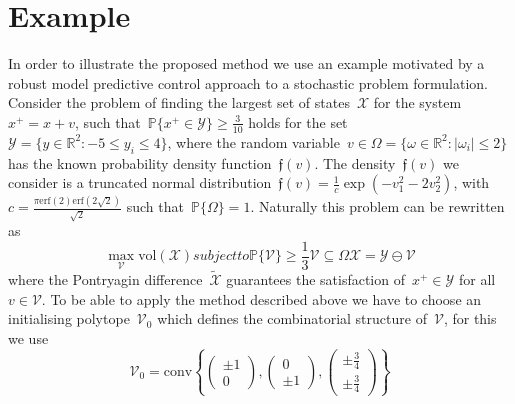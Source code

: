\documentclass[letterpaper, 10pt, conference]{ieeeconf} %
\providecommand{\abs}[1]{\left\lvert#1\right\rvert}
\providecommand{\conv}{\text{conv}}
\begin{document}
\section{Example}\label{sec:example}
%
%
\noindent In order to illustrate the proposed method we use an example motivated by a robust model predictive control approach to a stochastic problem formulation.
%
Consider the problem of finding the largest set of states~$\mathcal X$ for the system~$x^+=x+v$, such that~$\mathbb P\{x^+\in\mathcal Y\}\geq \frac{3}{10}$ holds for the set~$\mathcal Y = \{y\in\mathbb R^2:-5\leq y_i\leq 4\}$, where the random variable~$v\in\Omega=\{\omega\in\mathbb R^2:\abs{\omega_i}\leq2\}$ has the known probability density function~$\mathfrak f(v)$.
%
The density~$\mathfrak f(v)$ we consider is a truncated normal distribution~$\mathfrak f(v) = \frac{1}{c}\exp(-v_1^2-2v_2^2)$, with $c=\frac{\pi\text{erf}(2)\text{erf}(2\sqrt{2})}{\sqrt 2}$ such that~$\mathbb P\{\Omega\}=1$.
%
Naturally this problem can be rewritten as
%
\begin{subequations}\label{seq:example:original}
\begin{equation}
	\max_{\mathcal V} \text{vol}(\mathcal X)
\end{equation}
subject to
\begin{equation}
	\mathbb P\{\mathcal V\}\geq \frac{1}{3}
\end{equation}
\begin{equation}
	\mathcal V\subseteq\Omega
\end{equation}
\begin{equation}
	\mathcal X = \mathcal Y\ominus \mathcal V
\end{equation}
\end{subequations}
%
where the Pontryagin difference~$\tilde{\mathcal X}$ guarantees the satisfaction of~$x^+\in\mathcal Y$ for all~$v\in\mathcal V$.
%
To be able to apply the method described above we have to choose an initialising polytope~$\mathcal V_0$ which defines the combinatorial structure of~$\mathcal V$, for this we use 
%
\[
\mathcal V_0 = \conv\left\{\begin{pmatrix}\pm 1\\0 \end{pmatrix},\begin{pmatrix}0\\\pm1\end{pmatrix},\begin{pmatrix}\pm\frac{3}{4}\\\pm\frac{3}{4}\end{pmatrix}\right\}
\]
\end{document}
